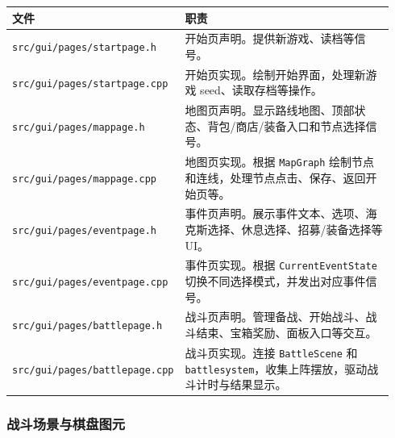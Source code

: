 \documentclass[UTF8,10pt]{ctexart}
\begin{document}
{\small
\begin{longtable}{p{0.34\linewidth}p{0.60\linewidth}}
\toprule
\textbf{文件} & \textbf{职责} \\
\midrule
\texttt{src/\allowbreak{}gui/\allowbreak{}pages/\allowbreak{}startpage.\allowbreak{}h} & 开始页声明。提供新游戏、读档等信号。 \\
\texttt{src/\allowbreak{}gui/\allowbreak{}pages/\allowbreak{}startpage.\allowbreak{}cpp} & 开始页实现。绘制开始界面，处理新游戏 seed、读取存档等操作。 \\
\texttt{src/\allowbreak{}gui/\allowbreak{}pages/\allowbreak{}mappage.\allowbreak{}h} & 地图页声明。显示路线地图、顶部状态、背包/商店/装备入口和节点选择信号。 \\
\texttt{src/\allowbreak{}gui/\allowbreak{}pages/\allowbreak{}mappage.\allowbreak{}cpp} & 地图页实现。根据 \texttt{MapGraph} 绘制节点和连线，处理节点点击、保存、返回开始页等。 \\
\texttt{src/\allowbreak{}gui/\allowbreak{}pages/\allowbreak{}eventpage.\allowbreak{}h} & 事件页声明。展示事件文本、选项、海克斯选择、休息选择、招募/装备选择等 UI。 \\
\texttt{src/\allowbreak{}gui/\allowbreak{}pages/\allowbreak{}eventpage.\allowbreak{}cpp} & 事件页实现。根据 \texttt{CurrentEventState} 切换不同选择模式，并发出对应事件信号。 \\
\texttt{src/\allowbreak{}gui/\allowbreak{}pages/\allowbreak{}battlepage.\allowbreak{}h} & 战斗页声明。管理备战、开始战斗、战斗结束、宝箱奖励、面板入口等交互。 \\
\texttt{src/\allowbreak{}gui/\allowbreak{}pages/\allowbreak{}battlepage.\allowbreak{}cpp} & 战斗页实现。连接 \texttt{BattleScene} 和 \texttt{battlesystem}，收集上阵摆放，驱动战斗计时与结果显示。 \\
\bottomrule
\end{longtable}
}

\subsubsection*{战斗场景与棋盘图元}
\end{document}
